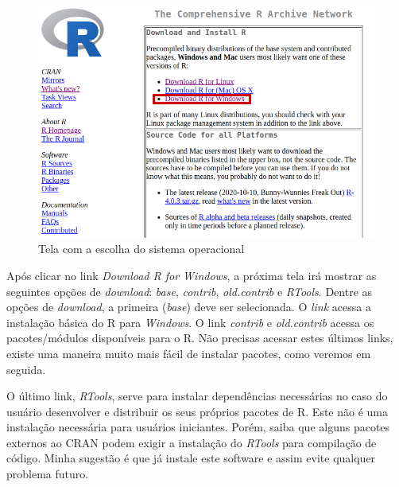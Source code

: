 \documentclass[
  11pt,
]{book}
\begin{document}
\begin{figure}[!htbp]

{\centering \includegraphics[width=1\linewidth]{00-text-resources/figs/website_cran_3} 

}

\caption{Tela com a escolha do sistema operacional}\label{fig:website-cran-3}
\end{figure}

Após clicar no link \emph{Download R for Windows}, a próxima tela irá mostrar as seguintes opções de \emph{download}: \emph{base}, \emph{contrib}, \emph{old.contrib} e \emph{RTools}. Dentre as opções de \emph{download}, a primeira (\emph{base}) deve ser selecionada. O \emph{link} acessa a instalação básica do R para \emph{Windows}. O link \emph{contrib} e \emph{old.contrib} acessa os pacotes/módulos disponíveis para o R. Não precisas acessar estes últimos links, existe uma maneira muito mais fácil de instalar pacotes, como veremos em seguida.

O último link, \emph{RTools}, serve para instalar dependências necessárias no caso do usuário desenvolver e distribuir os seus próprios pacotes de R. Este não é uma instalação necessária para usuários iniciantes. Porém, saiba que alguns pacotes externos ao CRAN podem exigir a instalação do \emph{RTools} para compilação de código. Minha sugestão é que já instale este software e assim evite qualquer problema futuro.
\end{document}
